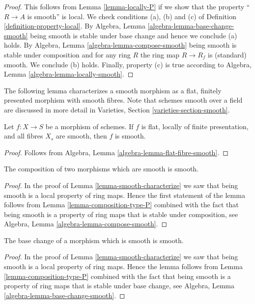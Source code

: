 \begin{proof}
This follows from Lemma \ref{lemma-locally-P} if we show that
the property ``$R \to A$ is smooth'' is local.
We check conditions (a), (b) and (c) of Definition
\ref{definition-property-local}.
By Algebra, Lemma \ref{algebra-lemma-base-change-smooth}
being smooth is stable under base change and hence
we conclude (a) holds. By
Algebra, Lemma \ref{algebra-lemma-compose-smooth}
being smooth is stable under composition and for any ring
$R$ the ring map $R \to R_f$ is (standard) smooth.
We conclude (b) holds. Finally, property (c) is true
according to Algebra, Lemma \ref{algebra-lemma-locally-smooth}.
\end{proof}

\noindent
The following lemma characterizes a smooth morphism as a
flat, finitely presented morphism with smooth fibres.
Note that schemes smooth over a field are discussed in more detail in
Varieties, Section \ref{varieties-section-smooth}.

\begin{lemma}
\label{lemma-smooth-flat-smooth-fibres}
Let $f : X \to S$ be a morphism of schemes.
If $f$ is flat, locally of finite presentation, and all
fibres $X_s$ are smooth, then $f$
is smooth.
\end{lemma}

\begin{proof}
Follows from Algebra, Lemma \ref{algebra-lemma-flat-fibre-smooth}.
\end{proof}

\begin{lemma}
\label{lemma-composition-smooth}
The composition of two morphisms which are smooth is smooth.
\end{lemma}

\begin{proof}
In the proof of Lemma \ref{lemma-smooth-characterize}
we saw that being smooth is a local property of ring maps.
Hence the first statement of the lemma follows from
Lemma \ref{lemma-composition-type-P} combined
with the fact that being smooth is a property of ring maps that is
stable under composition, see
Algebra, Lemma \ref{algebra-lemma-compose-smooth}.
\end{proof}

\begin{lemma}
\label{lemma-base-change-smooth}
The base change of a morphism which is smooth is smooth.
\end{lemma}

\begin{proof}
In the proof of Lemma \ref{lemma-smooth-characterize}
we saw that being smooth is a local property of ring maps.
Hence the lemma follows from
Lemma \ref{lemma-composition-type-P} combined
with the fact that being smooth is a property of ring maps that is
stable under base change, see
Algebra, Lemma \ref{algebra-lemma-base-change-smooth}.
\end{proof}

